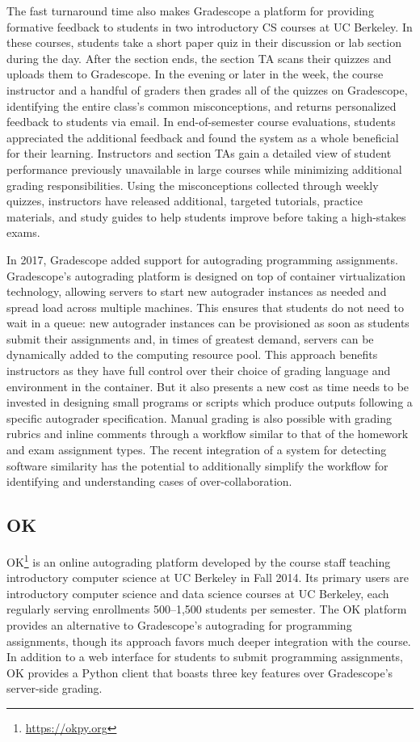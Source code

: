 The fast turnaround time also makes Gradescope a platform for providing formative feedback to students in two introductory CS courses at UC Berkeley. In these courses, students take a short paper quiz in their discussion or lab section during the day. After the section ends, the section TA scans their quizzes and uploads them to Gradescope. In the evening or later in the week, the course instructor and a handful of graders then grades all of the quizzes on Gradescope, identifying the entire class's common misconceptions, and returns personalized feedback to students via email. In end-of-semester course evaluations, students appreciated the additional feedback and found the system as a whole beneficial for their learning. Instructors and section TAs gain a detailed view of student performance previously unavailable in large courses while minimizing additional grading responsibilities. Using the misconceptions collected through weekly quizzes, instructors have released additional, targeted tutorials, practice materials, and study guides to help students improve before taking a high-stakes exams.

In 2017, Gradescope added support for autograding programming assignments. Gradescope's autograding platform is designed on top of container virtualization technology, allowing servers to start new autograder instances as needed and spread load across multiple machines. This ensures that students do not need to wait in a queue: new autograder instances can be provisioned as soon as students submit their assignments and, in times of greatest demand, servers can be dynamically added to the computing resource pool. This approach benefits instructors as they have full control over their choice of grading language and environment in the container. But it also presents a new cost as time needs to be invested in designing small programs or scripts which produce outputs following a specific autograder specification. Manual grading is also possible with grading rubrics and inline comments through a workflow similar to that of the homework and exam assignment types. The recent integration of a system for detecting software similarity has the potential to additionally simplify the workflow for identifying and understanding cases of over-collaboration.

\subsection{OK}

OK\footnote{\url{https://okpy.org}} is an online autograding platform developed by the course staff teaching introductory computer science at UC Berkeley in Fall 2014. Its primary users are introductory computer science and data science courses at UC Berkeley, each regularly serving enrollments 500--1,500 students per semester. The OK platform provides an alternative to Gradescope's autograding for programming assignments, though its approach favors much deeper integration with the course. In addition to a web interface for students to submit programming assignments, OK provides a Python client that boasts three key features over Gradescope's server-side grading.

